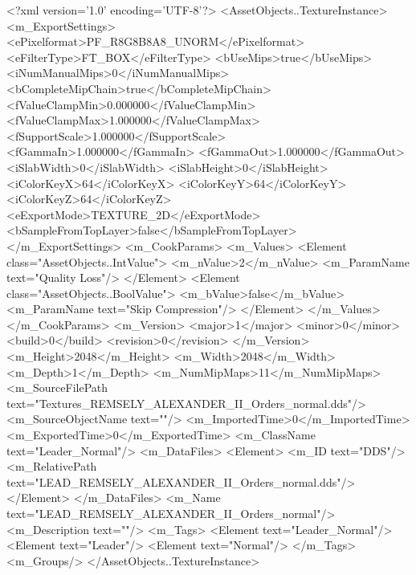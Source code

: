 <?xml version='1.0' encoding='UTF-8'?>
<AssetObjects..TextureInstance>
  <m_ExportSettings>
    <ePixelformat>PF_R8G8B8A8_UNORM</ePixelformat>
    <eFilterType>FT_BOX</eFilterType>
    <bUseMips>true</bUseMips>
    <iNumManualMips>0</iNumManualMips>
    <bCompleteMipChain>true</bCompleteMipChain>
    <fValueClampMin>0.000000</fValueClampMin>
    <fValueClampMax>1.000000</fValueClampMax>
    <fSupportScale>1.000000</fSupportScale>
    <fGammaIn>1.000000</fGammaIn>
    <fGammaOut>1.000000</fGammaOut>
    <iSlabWidth>0</iSlabWidth>
    <iSlabHeight>0</iSlabHeight>
    <iColorKeyX>64</iColorKeyX>
    <iColorKeyY>64</iColorKeyY>
    <iColorKeyZ>64</iColorKeyZ>
    <eExportMode>TEXTURE_2D</eExportMode>
    <bSampleFromTopLayer>false</bSampleFromTopLayer>
  </m_ExportSettings>
  <m_CookParams>
    <m_Values>
      <Element class="AssetObjects..IntValue">
        <m_nValue>2</m_nValue>
        <m_ParamName text="Quality Loss"/>
      </Element>
      <Element class="AssetObjects..BoolValue">
        <m_bValue>false</m_bValue>
        <m_ParamName text="Skip Compression"/>
      </Element>
    </m_Values>
  </m_CookParams>
  <m_Version>
    <major>1</major>
    <minor>0</minor>
    <build>0</build>
    <revision>0</revision>
  </m_Version>
  <m_Height>2048</m_Height>
  <m_Width>2048</m_Width>
  <m_Depth>1</m_Depth>
  <m_NumMipMaps>11</m_NumMipMaps>
  <m_SourceFilePath text="Textures\LEAD_REMSELY_ALEXANDER_II_Orders_normal.dds"/>
  <m_SourceObjectName text=""/>
  <m_ImportedTime>0</m_ImportedTime>
  <m_ExportedTime>0</m_ExportedTime>
  <m_ClassName text="Leader_Normal"/>
  <m_DataFiles>
    <Element>
      <m_ID text="DDS"/>
      <m_RelativePath text="LEAD_REMSELY_ALEXANDER_II_Orders_normal.dds"/>
    </Element>
  </m_DataFiles>
  <m_Name text="LEAD_REMSELY_ALEXANDER_II_Orders_normal"/>
  <m_Description text=""/>
  <m_Tags>
    <Element text="Leader_Normal"/>
    <Element text="Leader"/>
    <Element text="Normal"/>
  </m_Tags>
  <m_Groups/>
</AssetObjects..TextureInstance>
